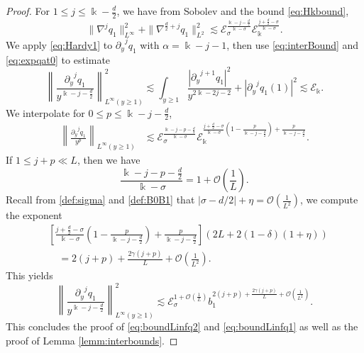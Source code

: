 \documentclass[11pt]{aims}
\theoremstyle{definition}
\numberwithin{equation}{section}
\begin{document}
\begin{proof}
For $1 \leq j \leq \Bbbk - \frac{d}{2}$, we have from Sobolev and the bound \eqref{eq:Hkbound},
\begin{equation}\label{eq:boudLinq1k}
\|\nabla^j q_1\|^2_{L^\infty} + \|\nabla^{\frac d2 + j} q_1\|^2_{L^2} \lesssim  {\mathscr{E}}_\sigma^{\frac{\Bbbk - j - \frac{d}{2}}{\Bbbk - \sigma}}{\mathscr{E}}_\Bbbk^\frac{j + \frac{d}{2} - \sigma}{\Bbbk - \sigma}.
\end{equation}
We apply \eqref{eq:Hardy1} to ${\partial_y}^{j}q_1$ with $\alpha = \Bbbk - j - 1$, then use \eqref{eq:interBound} and \eqref{eq:expqat0} to estimate
\begin{equation*}
\left\|\frac{{\partial_y}^j q_1}{y^{\Bbbk - j - \frac{d}{2}}} \right\|^2_{L^\infty(y \geq 1)} \lesssim \int_{y \geq 1} \frac{|{\partial_y}^{j + 1} q_1|^2}{y^{2\Bbbk - 2j - 2}} + |{\partial_y}^{j}q_1(1)|^2 \lesssim {\mathscr{E}}_\Bbbk.
\end{equation*}
We interpolate for $0 \leq p \leq \Bbbk - j - \frac{d}{2}$, 
\begin{align*}
\left\|\frac{{\partial_y}^j q_1}{y^{p}} \right\|_{L^\infty(y \geq 1)} &\lesssim {\mathscr{E}}_\sigma^{\frac{\Bbbk - j - p - \frac{d}{2}}{\Bbbk - \sigma}}{\mathscr{E}}_\Bbbk^{\frac{j + \frac{d}{2} -  \sigma}{\Bbbk - \sigma}\left(1 - \frac{p}{\Bbbk - j - \frac d2}\right) + \frac{p}{\Bbbk - j - \frac d2}}.
\end{align*}
If $1 \leq j  + p\ll L$, then we have 
$$\frac{\Bbbk - j - p - \frac{d}{2}}{\Bbbk - \sigma} = 1 + {\mathcal{O}}\left(\frac{1}{L}\right).$$
Recall from \eqref{def:sigma} and \eqref{def:B0B1} that $|\sigma - d/2| + \eta = {\mathcal{O}}\left(\frac{1}{L^2}\right)$, we compute the exponent
\begin{align*}
&\left[\frac{j + \frac{d}{2} -  \sigma}{\Bbbk - \sigma}\left(1 - \frac{p}{\Bbbk - j - \frac d2}\right) + \frac{p}{\Bbbk - j - \frac d2}\right](2L + 2(1 - \delta)(1 + \eta))\\
& \quad = 2(j + p) + \frac{2\gamma(j + p)}{L} +  {\mathcal{O}}\left(\frac{1}{L^2}\right).
\end{align*}
This yields
$$\left\|\frac{{\partial_y}^j q_1}{y^{\Bbbk - j - \frac{d}{2}}} \right\|^2_{L^\infty(y \geq 1)} \lesssim {\mathscr{E}}_\sigma^{1 + {\mathcal{O}}\left(\frac 1L\right)}b_1^{2(j+p) + \frac{2\gamma(j+p)}{L} + {\mathcal{O}}\left(\frac{1}{L^2}\right)}.$$
This concludes the proof of \eqref{eq:boundLinfq2} and \eqref{eq:boundLinfq1} as well as the proof of Lemma \ref{lemm:interbounds}.
\end{proof}
\end{document}
